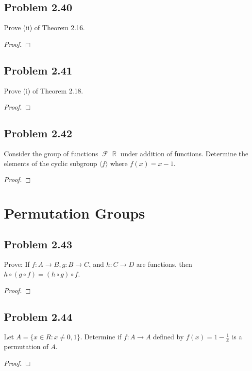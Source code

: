 \documentclass{amsbook}
\newcommand{\pid}[1]{\langle #1 \rangle}
\DeclareMathOperator{\R}{\mathbb{R}}
\DeclareMathOperator{\func}{\mathscr{F}}
\begin{document}
			\subsection*{Problem 2.40}
			\label{sub:problem_2_40}
			Prove (ii) of Theorem 2.16.
			\begin{proof}
			\end{proof}

			\subsection*{Problem 2.41}
			\label{sub:problem_2_41}
			Prove (i) of Theorem 2.18.
			\begin{proof}
			\end{proof}

			\subsection*{Problem 2.42}
			\label{sub:problem_2_42}
			Consider the group of functions $\func{\R}$ under addition of functions. 
			Determine the elements of the cyclic subgroup $\pid{f}$ where $f(x) = x - 1$.
			\begin{proof}
			\end{proof}

		\section{Permutation Groups}
		\label{sec:permutation_groups}
			\subsection*{Problem 2.43}
			\label{sub:problem_2_43}
			Prove: If $f:A \to B, g:B \to C$, and $h:C \to D$ are functions, then $h \circ (g \circ f) = (h \circ g) \circ f$.
			\begin{proof}
			\end{proof}

			\subsection*{Problem 2.44}
			\label{sub:problem_2_44}
			Let $A = \{ x \in R : x \neq 0, 1 \}$.
			Determine if $f:A \to A$ defined by $f(x) = 1 - \frac{1}{x}$ is a permutation of $A$.
			\begin{proof}
			\end{proof}
\end{document}
